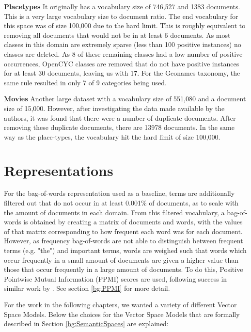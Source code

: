 \textbf{Placetypes} It originally has a vocabulary size of 746,527 and 1383 documents. This is a very large vocabulary size to document ratio. The end vocabulary for this space was of size 100,000 due to the hard limit. This is roughly equivalent to removing all documents that would not be in at least 6 documents. As most classes in this domain are extremely sparse (less than 100 positive instances) no classes are deleted. As 8 of these remaining classes had a low number of positive occurrences, OpenCYC classes are removed that do not have positive instances for at least 30 documents, leaving us with 17. For the Geonames taxonomy, the same rule resulted in only 7 of 9 categories being used.

\textbf{Movies} Another large dataset with a vocabulary size of 551,080 and a document size of 15,000. However, after investigating the data made available by the authors, it was found that there were a number of duplicate documents. After removing these duplicate documents, there are 13978 documents. In the same way as the place-types, the vocabulary hit the hard limit of size 100,000. 



\section{Representations}

For the bag-of-words representation used as a baseline, terms are additionally filtered out that do not occur in at least 0.001\% of documents, as to scale with the amount of documents in each domain. From this filtered vocabulary, a bag-of-words is obtained by creating a matrix of documents and words, with  the values of that matrix corresponding to how frequent each word was for each document. However, as frequency bag-of-words are not able to distinguish between frequent terms (e.g. "the") and important terms, words are weighed such that words which occur frequently in a small amount of documents are given a higher value than those that occur frequently in a large amount of documents. To do this, Positive Pointwise Mutual Information (PPMI) scores are used, following success in similar work by \cite{Derrac2015}. See section \ref{bg:PPMI} for more detail.

For the work in the following chapters, we wanted a variety of different Vector Space Models. Below the choices for the Vector Space Models that are formally described in Section \ref{bg:SemanticSpaces} are explained:


